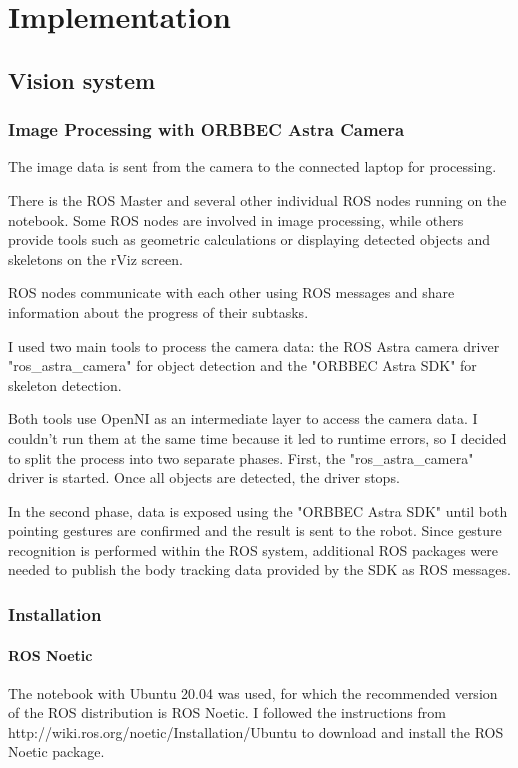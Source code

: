 \chapter{Implementation}

\section{Vision system}

\subsection{Image Processing with ORBBEC Astra Camera}
The image data is sent from the camera to the connected laptop for processing.\par
There is the ROS Master and several other individual ROS nodes running on the notebook. Some ROS nodes are involved in image processing, while others provide tools such as geometric calculations or displaying detected objects and skeletons on the rViz screen.\par
ROS nodes communicate with each other using ROS messages and share information about the progress of their subtasks.\par
I used two main tools to process the camera data: the ROS Astra camera driver "ros\_astra\_camera" for object detection and the "ORBBEC Astra SDK" for skeleton detection.\par
Both tools use OpenNI as an intermediate layer to access the camera data. I couldn't run them at the same time because it led to runtime errors, so I decided to split the process into two separate phases.
First, the "ros\_astra\_camera" driver is started. Once all objects are detected, the driver stops.\par
In the second phase, data is exposed using the "ORBBEC Astra SDK" until both pointing gestures are confirmed and the result is sent to the robot. Since gesture recognition is performed within the ROS system, additional ROS packages were needed to publish the body tracking data provided by the SDK as ROS messages.\par

\subsection{Installation}

\subsubsection{ROS Noetic}
The notebook with Ubuntu 20.04 was used, for which the recommended version of the ROS distribution is ROS Noetic. I followed the instructions from http://wiki.ros.org/noetic/Installation/Ubuntu to download and install the ROS Noetic package.\par

